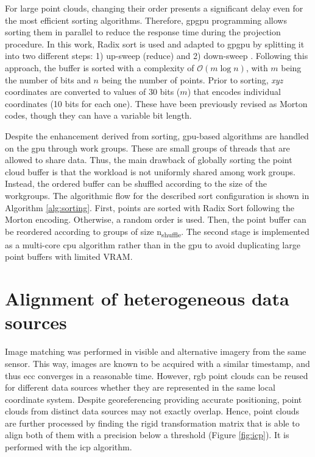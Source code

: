 For large point clouds, changing their order presents a significant delay even for the most efficient sorting algorithms. Therefore, \acrshort{gpgpu} programming allows sorting them in parallel to reduce the response time during the projection procedure. In this work, Radix sort is used and adapted to \acrshort{gpgpu} by splitting it into two different steps: 1) up-sweep (reduce) and 2) down-sweep \cite{nguyen_gpu_2007}. Following this approach, the buffer is sorted with a complexity of $\mathcal{O}(m\log{}n)$, with $m$ being the number of bits and $n$ being the number of points. Prior to sorting, \textit{xyz} coordinates are converted to values of 30 bits ($m$) that encodes individual coordinates (10 bits for each one). These have been previously revised as Morton codes, though they can have a variable bit length.

Despite the enhancement derived from sorting, \acrshort{gpu}-based algorithms are handled on the \acrshort{gpu} through work groups. These are small groups of threads that are allowed to share data. Thus, the main drawback of globally sorting the point cloud buffer is that the workload is not uniformly shared among work groups. Instead, the ordered buffer can be shuffled according to the size of the workgroups. The algorithmic flow for the described sort configuration is shown in Algorithm \ref{alg:sorting}. First, points are sorted with Radix Sort following the Morton encoding. Otherwise, a random order is used. Then, the point buffer can be reordered according to groups of size n\textsubscript{shuffle}. The second stage is implemented as a multi-core \acrshort{cpu} algorithm rather than in the \acrshort{gpu} to avoid duplicating large point buffers with limited VRAM.

\section{Alignment of heterogeneous data sources}

Image matching was performed in visible and alternative imagery from the same sensor. This way, images are known to be acquired with a similar timestamp, and thus \acrshort{ecc} converges in a reasonable time. However, \acrshort{rgb} point clouds can be reused for different data sources whether they are represented in the same local coordinate system. Despite georeferencing providing accurate positioning, point clouds from distinct data sources may not exactly overlap. Hence, point clouds are further processed by finding the rigid transformation matrix that is able to align both of them with a precision below a threshold (Figure \ref{fig:icp}). It is performed with the \acrshort{icp} algorithm.

